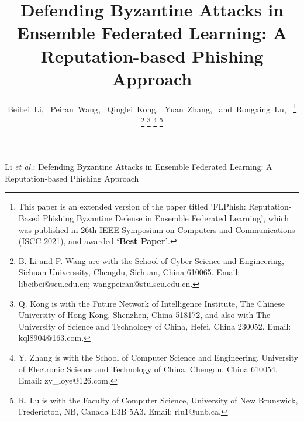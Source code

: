 \documentclass[journal]{IEEEtran}
\begin{document}
\title{Defending Byzantine Attacks in Ensemble Federated Learning: A Reputation-based Phishing Approach}
\author{Beibei~Li,~
        Peiran~Wang,~
        Qinglei~Kong,~
        Yuan~Zhang,~
        and~Rongxing~Lu,~
\thanks{This paper is an extended version of the paper titled `FLPhish: Reputation-Based Phishing Byzantine Defense in Ensemble Federated Learning', which was published in 26th IEEE Symposium on Computers and Communications (ISCC 2021), and awarded \textbf{`Best Paper'}.}
\thanks{B. Li and P. Wang are with the School of Cyber Science and Engineering, Sichuan Universsity, Chengdu, Sichuan, China 610065. Email: libeibei@scu.edu.cn; wangpeiran@stu.scu.edu.cn.}
\thanks{Q. Kong is with the Future Network of Intelligence Institute, The Chinese University of Hong Kong, Shenzhen, China 518172, and also with The University of Science and Technology of China, Hefei, China 230052. Email: kql8904@163.com.}
\thanks{Y. Zhang is with the School of Computer Science and Engineering, University of Electronic Science and Technology of China, Chengdu, China 610054. Email: zy\_loye@126.com.}
\thanks{R. Lu is with the Faculty of Computer Science, University of New Brunswick, Fredericton, NB, Canada E3B 5A3. Email: rlu1@unb.ca.}
}

%
{Li \MakeLowercase{\textit{et al.}}: Defending Byzantine Attacks in Ensemble Federated Learning: A Reputation-based Phishing Approach}


\maketitle
\end{document}
